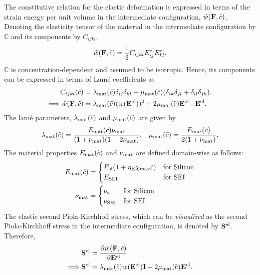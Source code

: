 The constitutive relation for the elastic deformation is expressed in terms of the strain energy per unit volume in the intermediate configuration, $\hat{w}(\mathbf{F}, \tilde{c})$. Denoting the elasticity tensor of the material in the intermediate configuration by $\mathbb{C}$ and its components by $C_{ijkl}$,
\begin{gather}
    \hat{w}(\mathbf{F}, \tilde{c}) = \frac{1}{2} C_{ijkl} E_{ij}^{{\rm{el}}} E_{kl}^{{\rm{el}}}.
\end{gather}
$\mathbb{C}$ is concentration-dependent and assumed to be isotropic. Hence, its components can be expressed in terms of Lam\'{e} coefficients as 
\begin{align}
 C_{ijkl}(\tilde{c}) &= \lambda_{\rm{mat}}(\tilde{c})\delta_{ij} \delta_{kl} +  \mu_{\rm{mat}}(\tilde{c})(\delta_{ik} \delta_{jl} + \delta_{il} \delta_{jk}). \\
    \Longrightarrow \hat{w}(\mathbf{F}, \tilde{c}) &= \lambda_{\rm{mat}}(\tilde{c}) (\rm{tr}(\mathbf{E}^{\rm{el}}))^2 + 2 \mu_{\rm{mat}}(\tilde{c}) \mathbf{E}^{{\rm{el}}}:\mathbf{E}^{{\rm{el}}}.
\end{align}
The lam\'{e} parameters, $\lambda_{\rm{mat}}(\tilde{c})$ and $\mu_{\rm{mat}}(\tilde{c})$ are given by
\begin{align}
    \lambda_{\rm{mat}}(\tilde{c}) = \frac{E_{\rm{mat}}(\tilde{c}) \nu_{\rm{mat}}}{(1+\nu_{\rm{mat}})(1-2\nu_{\rm{mat}})},
    && \mu_{\rm{mat}}(\tilde{c}) = \frac{E_{\rm{mat}}(\tilde{c})}{2(1+\nu_{\rm{mat}})}. \nonumber
\end{align}
The material properties $E_{\rm{mat}}(\tilde{c})$ and $\nu_{\rm{mat}}$ are defined domain-wise as follows:
\begin{align}
E_{\rm{mat}}(\tilde{c}) &= \begin{cases}
 E_{\text{si}}(1 + \eta_{\rm{E}} \chi_{\rm{max}} \tilde{c}) & \text{for Silicon}\\
 E_{\rm{SEI}} & \text{for SEI }
\end{cases} \\
\nu_{\rm{mat}} &= \begin{cases}
\nu_{\rm{si}} & \text{for Silicon} \\
\nu_{\rm{SEI}} &  \text{for SEI }
\end{cases}
\end{align}
The elastic second Piola-Kirchhoff stress, which can be \textit{visualized} as the second Piola-Kirchhoff stress in the intermediate configuration, is denoted by $\mathbf{S}^{\rm{el}}$. Therefore, 
\begin{align}
    \mathbf{S}^{\rm{el}} &= \frac{\partial \hat{w}(\mathbf{F}, \tilde{c})}{\partial \mathbf{E}^{{\rm{el}}}}\nonumber \\
    \Longrightarrow  \mathbf{S}^{\rm{el}} &= \lambda_{\rm{mat}}(\tilde{c}) \rm{tr}(\mathbf{E}^{\rm{el}})\mathbf{I} + 2 \mu_{\rm{mat}}(\tilde{c}) \mathbf{E}^{\rm{el}}. \label{eq:Sel_tensor}
\end{align}
\\
